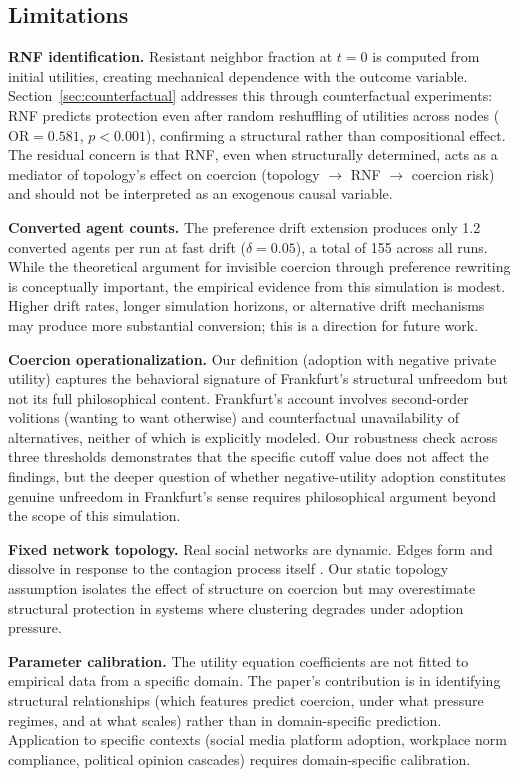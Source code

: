 \documentclass[11pt, a4paper]{article}
\newcommand{\OR}{\text{OR}}
\begin{document}
\subsection{Limitations}

\textbf{RNF identification.} Resistant neighbor fraction at $t = 0$ is computed from initial utilities, creating mechanical dependence with the outcome variable. Section~\ref{sec:counterfactual} addresses this through counterfactual experiments: RNF predicts protection even after random reshuffling of utilities across nodes ($\OR = 0.581$, $p < 0.001$), confirming a structural rather than compositional effect. The residual concern is that RNF, even when structurally determined, acts as a mediator of topology's effect on coercion (topology $\to$ RNF $\to$ coercion risk) and should not be interpreted as an exogenous causal variable.

\textbf{Converted agent counts.} The preference drift extension produces only 1.2 converted agents per run at fast drift ($\delta = 0.05$), a total of 155 across all runs. While the theoretical argument for invisible coercion through preference rewriting is conceptually important, the empirical evidence from this simulation is modest. Higher drift rates, longer simulation horizons, or alternative drift mechanisms may produce more substantial conversion; this is a direction for future work.

\textbf{Coercion operationalization.} Our definition (adoption with negative private utility) captures the behavioral signature of Frankfurt's structural unfreedom but not its full philosophical content. Frankfurt's account involves second-order volitions (wanting to want otherwise) and counterfactual unavailability of alternatives, neither of which is explicitly modeled. Our robustness check across three thresholds demonstrates that the specific cutoff value does not affect the findings, but the deeper question of whether negative-utility adoption constitutes genuine unfreedom in Frankfurt's sense requires philosophical argument beyond the scope of this simulation.

\textbf{Fixed network topology.} Real social networks are dynamic. Edges form and dissolve in response to the contagion process itself \citep{gross2008adaptive}. Our static topology assumption isolates the effect of structure on coercion but may overestimate structural protection in systems where clustering degrades under adoption pressure.

\textbf{Parameter calibration.} The utility equation coefficients are not fitted to empirical data from a specific domain. The paper's contribution is in identifying structural relationships (which features predict coercion, under what pressure regimes, and at what scales) rather than in domain-specific prediction. Application to specific contexts (social media platform adoption, workplace norm compliance, political opinion cascades) requires domain-specific calibration.
\end{document}
